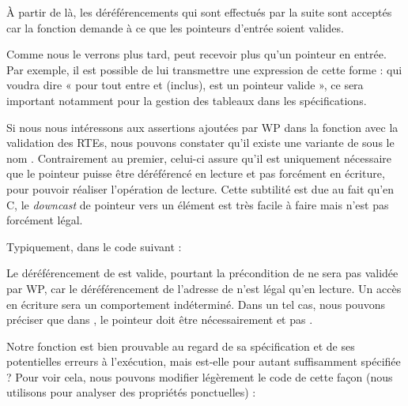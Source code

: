 À partir de là, les déréférencements qui sont effectués par la suite sont
acceptés car la fonction demande à ce que les pointeurs d'entrée soient
valides.



Comme nous le verrons plus tard,  peut recevoir plus qu'un
pointeur en entrée. Par exemple, il est possible de lui transmettre une
expression de cette forme :  qui voudra dire « pour
tout  entre  et  (inclus),  est un pointeur valide », ce sera important
notamment pour la gestion des tableaux dans les spécifications.



Si nous nous intéressons aux assertions ajoutées par WP dans la fonction 
avec la validation des RTEs, nous pouvons constater qu'il existe une variante
de  sous le nom . Contrairement au premier,
celui-ci assure qu'il est uniquement nécessaire que le pointeur puisse
être déréférencé en lecture et pas forcément en écriture, pour pouvoir
réaliser l'opération de lecture. Cette subtilité est due au fait qu'en C, le
\textit{downcast} de pointeur vers un élément  est très facile à faire mais
n'est pas forcément légal.



Typiquement, dans le code suivant :






Le déréférencement de  est valide, pourtant la précondition de 
ne sera pas validée par WP, car le déréférencement de l'adresse de 
n'est légal qu'en lecture. Un accès en écriture sera un comportement
indéterminé. Dans un tel cas, nous pouvons préciser que dans , le
pointeur  doit être nécessairement  et pas .





Notre fonction  est bien prouvable au regard de sa spécification et
de ses potentielles erreurs à l'exécution, mais est-elle pour autant
suffisamment spécifiée ? Pour voir cela, nous pouvons modifier légèrement le code
de cette façon (nous utilisons  pour analyser des propriétés
ponctuelles) :



